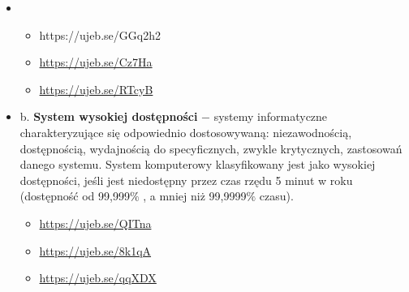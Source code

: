 \documentclass[12pt]{article}
\renewcommand{\_}{\kern-1.5pt\textunderscore\kern-1.5pt}
\begin{document}
\begin{itemize}
\begin{itemize}
	\item \begin{itemize}
	\item https://ujeb.se/GGq2h2\par

	\item \href{https://ujeb.se/Cz7Ha}{https://ujeb.se/Cz7Ha}\par

	\item \href{https://ujeb.se/RTcyB}{https://ujeb.se/RTcyB}\par


\end{itemize}
	\item b. \textbf{System wysokiej dostępności} $-$  systemy informatyczne charakteryzujące się odpowiednio dostosowywaną: niezawodnością, dostępnością, wydajnością do specyficznych, zwykle krytycznych, zastosowań danego systemu. System komputerowy klasyfikowany jest jako wysokiej dostępności, jeśli jest niedostępny przez czas rzędu 5 minut w roku (dostępność od 99,999$\%$ , a mniej niż 99,9999$\%$  czasu).\par

\begin{itemize}
	\item \href{https://ujeb.se/QITna%20}{https://ujeb.se/QITna} \par

	\item \href{https://ujeb.se/8k1qA}{https://ujeb.se/8k1qA}\par

	\item \href{https://ujeb.se/qqXDX}{https://ujeb.se/qqXDX}
\end{itemize}
\end{itemize}
\end{itemize}\par


\vspace{\baselineskip}

\vspace{\baselineskip}

\vspace{\baselineskip}

\vspace{\baselineskip}

\vspace{\baselineskip}

\vspace{\baselineskip}
\\
\end{document}
